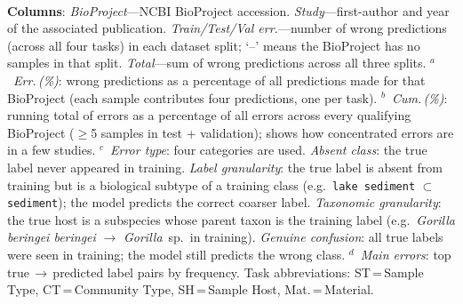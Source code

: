 \\[2mm]
{\footnotesize \textbf{Columns}: \textit{BioProject}---NCBI BioProject accession. \textit{Study}---first-author and year of the associated publication. \textit{Train/Test/Val err.}---number of wrong predictions (across all four tasks) in each dataset split; `{--}' means the BioProject has no samples in that split. \textit{Total}---sum of wrong predictions across all three splits. $^{a}$~\textit{Err.\,(\%)}: wrong predictions as a percentage of all predictions made for that BioProject (each sample contributes four predictions, one per task). $^{b}$~\textit{Cum.\,(\%)}: running total of errors as a percentage of all errors across every qualifying BioProject ($\geq$5 samples in test + validation); shows how concentrated errors are in a few studies. $^{c}$~\textit{Error type}: four categories are used. \textit{Absent class}: the true label never appeared in training. \textit{Label granularity}: the true label is absent from training but is a biological subtype of a training class (e.g.\ \texttt{lake sediment} $\subset$ \texttt{sediment}); the model predicts the correct coarser label. \textit{Taxonomic granularity}: the true host is a subspecies whose parent taxon is the training label (e.g.\ \textit{Gorilla beringei beringei} $\to$ \textit{Gorilla}~sp.\ in training). \textit{Genuine confusion}: all true labels were seen in training; the model still predicts the wrong class. $^{d}$~\textit{Main errors}: top true\,$\to$\,predicted label pairs by frequency. Task abbreviations: ST\,=\,Sample Type, CT\,=\,Community Type, SH\,=\,Sample Host, Mat.\,=\,Material.}